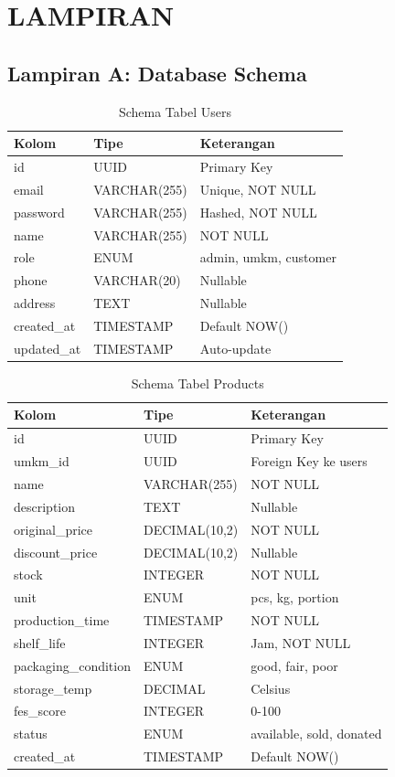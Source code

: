 \section*{LAMPIRAN}
{}

\subsection*{Lampiran A: Database Schema}
{}

\begin{table}[H]
\centering
\caption{Schema Tabel Users}
\label{tab:schema_users}
\begin{tabularx}{\textwidth}{lXX}
\toprule
\textbf{Kolom} & \textbf{Tipe} & \textbf{Keterangan} \\
\midrule
id & UUID & Primary Key \\
email & VARCHAR(255) & Unique, NOT NULL \\
password & VARCHAR(255) & Hashed, NOT NULL \\
name & VARCHAR(255) & NOT NULL \\
role & ENUM & admin, umkm, customer \\
phone & VARCHAR(20) & Nullable \\
address & TEXT & Nullable \\
created\_at & TIMESTAMP & Default NOW() \\
updated\_at & TIMESTAMP & Auto-update \\
\bottomrule
\end{tabularx}
\end{table}

\begin{table}[H]
\centering
\caption{Schema Tabel Products}
\label{tab:schema_products}
\begin{tabularx}{\textwidth}{lXX}
\toprule
\textbf{Kolom} & \textbf{Tipe} & \textbf{Keterangan} \\
\midrule
id & UUID & Primary Key \\
umkm\_id & UUID & Foreign Key ke users \\
name & VARCHAR(255) & NOT NULL \\
description & TEXT & Nullable \\
original\_price & DECIMAL(10,2) & NOT NULL \\
discount\_price & DECIMAL(10,2) & Nullable \\
stock & INTEGER & NOT NULL \\
unit & ENUM & pcs, kg, portion \\
production\_time & TIMESTAMP & NOT NULL \\
shelf\_life & INTEGER & Jam, NOT NULL \\
packaging\_condition & ENUM & good, fair, poor \\
storage\_temp & DECIMAL & Celsius \\
fes\_score & INTEGER & 0-100 \\
status & ENUM & available, sold, donated \\
created\_at & TIMESTAMP & Default NOW() \\
\bottomrule
\end{tabularx}
\end{table}